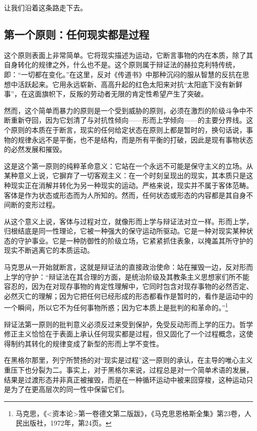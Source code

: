 \documentclass[fontset=fandol, a4paper, 12pt, twoside]{ctexart}
\begin{document}
让我们沿着这条路走下去。

\subsection{第一个原则：任何现实都是过程}

这个原则表面上非常简单。它将现实描述为运动，它断言事物的内在本质，除了其自身转化的规律之外，什么也不是。这个原则属于辩证法的赫拉克利特传统，即：“一切都在变化。”在这里，反对《传道书》中那种沉闷的服从智慧的反抗在思想中活跃起来。它用永远崭新、高高升起的红色太阳来对抗“太阳底下没有新鲜事”，在这面旗帜下，反叛的劳动者无限的肯定性希望产生了突破。

然而，这个简单而暴力的原则是一个受到威胁的原则，必须在激烈的阶级斗争中不断重新夺回，因为它划清了与对抗性倾向——形而上学倾向——的主要分界线。这个原则的本质在于断言，现实的任何给定状态在原则上都是暂时的，换句话说，事物的规律永远不是平衡，也不是结构，而是所有平衡的打破，因此是现有事物状态的必然发展和摧毁。

这是这个第一原则的纯粹革命意义：它站在一个永远不可能是保守主义的立场。从某种意义上说，它摒弃了一切客观主义：在一个时刻呈现出的现实，其本质只是这种现实正在消解并转化为另一种现实的运动。严格来说，现实并不属于客体范畴。客体是作为状态或形态而为人所知的。然而，任何状态或形态的内容都是其自身不间断的变形过程。

从这个意义上说，客体与过程对立，就像形而上学与辩证法对立一样。形而上学，归根结底是同一性理论，它被一种强大的保守运动所驱动。它是一种对现实某种状态的守护事业。它是一种防御性的阶级立场，它紧紧抓住表象，以掩盖其所守护的现实不断逃离它的本质运动。

马克思从一开始就断言，这就是辩证法的直接政治使命：站在摧毁一边，反对形而上学的守护：“辩证法在其合理的方面，是统治阶级及其教条主义思想家们所不能容忍的，因为在对现存事物的肯定性理解中，它同时包含对现存事物的必然否定、必然灭亡的理解；因为它把任何已经形成的形态都看作是暂时的，看作是运动中的一个瞬间，所以它不为任何事物所惑；因为它本质上是批判的和革命的。”\footnote{马克思，《<资本论>第一卷德文第二版跋》，《马克思恩格斯全集》第23卷，人民出版社，1972年，第24页。}

辩证法第一原则的批判意义必须反过来受到保护，免受反动形而上学的压力。哲学修正主义恰恰在于表面上承认任何现实都是过程，但又固化了一个过程概念，这使得制约其转化的规律变成了新型的形而上学不变性。

在黑格尔那里，列宁所赞扬的对“现实是过程”这一原则的承认，在主导的唯心主义重压下也分裂为二。事实上，对于黑格尔来说，过程总是对一个简单术语的发展，结果是过渡形态并非真正被摧毁，而是在一种循环运动中被来回穿梭，这种运动只是为了在更高层次的同一性中保留它们。
\end{document}
